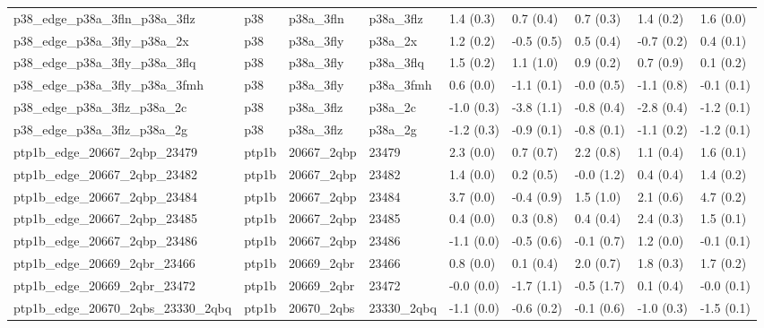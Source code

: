 \begin{tabular}{lllllllll}
p38\_edge\_p38a\_3fln\_p38a\_3flz     &       p38 &   p38a\_3fln &   p38a\_3flz &   1.4 (0.3) &         0.7 (0.4) &   0.7 (0.3) &   1.4 (0.2) &   1.6 (0.0) \\
p38\_edge\_p38a\_3fly\_p38a\_2x       &       p38 &   p38a\_3fly &     p38a\_2x &   1.2 (0.2) &        -0.5 (0.5) &   0.5 (0.4) &  -0.7 (0.2) &   0.4 (0.1) \\
p38\_edge\_p38a\_3fly\_p38a\_3flq     &       p38 &   p38a\_3fly &   p38a\_3flq &   1.5 (0.2) &         1.1 (1.0) &   0.9 (0.2) &   0.7 (0.9) &   0.1 (0.2) \\
p38\_edge\_p38a\_3fly\_p38a\_3fmh     &       p38 &   p38a\_3fly &   p38a\_3fmh &   0.6 (0.0) &        -1.1 (0.1) &  -0.0 (0.5) &  -1.1 (0.8) &  -0.1 (0.1) \\
p38\_edge\_p38a\_3flz\_p38a\_2c       &       p38 &   p38a\_3flz &     p38a\_2c &  -1.0 (0.3) &        -3.8 (1.1) &  -0.8 (0.4) &  -2.8 (0.4) &  -1.2 (0.1) \\
p38\_edge\_p38a\_3flz\_p38a\_2g       &       p38 &   p38a\_3flz &     p38a\_2g &  -1.2 (0.3) &        -0.9 (0.1) &  -0.8 (0.1) &  -1.1 (0.2) &  -1.2 (0.1) \\
ptp1b\_edge\_20667\_2qbp\_23479      &     ptp1b &  20667\_2qbp &       23479 &   2.3 (0.0) &         0.7 (0.7) &   2.2 (0.8) &   1.1 (0.4) &   1.6 (0.1) \\
ptp1b\_edge\_20667\_2qbp\_23482      &     ptp1b &  20667\_2qbp &       23482 &   1.4 (0.0) &         0.2 (0.5) &  -0.0 (1.2) &   0.4 (0.4) &   1.4 (0.2) \\
ptp1b\_edge\_20667\_2qbp\_23484      &     ptp1b &  20667\_2qbp &       23484 &   3.7 (0.0) &        -0.4 (0.9) &   1.5 (1.0) &   2.1 (0.6) &   4.7 (0.2) \\
ptp1b\_edge\_20667\_2qbp\_23485      &     ptp1b &  20667\_2qbp &       23485 &   0.4 (0.0) &         0.3 (0.8) &   0.4 (0.4) &   2.4 (0.3) &   1.5 (0.1) \\
ptp1b\_edge\_20667\_2qbp\_23486      &     ptp1b &  20667\_2qbp &       23486 &  -1.1 (0.0) &        -0.5 (0.6) &  -0.1 (0.7) &   1.2 (0.0) &  -0.1 (0.1) \\
ptp1b\_edge\_20669\_2qbr\_23466      &     ptp1b &  20669\_2qbr &       23466 &   0.8 (0.0) &         0.1 (0.4) &   2.0 (0.7) &   1.8 (0.3) &   1.7 (0.2) \\
ptp1b\_edge\_20669\_2qbr\_23472      &     ptp1b &  20669\_2qbr &       23472 &  -0.0 (0.0) &        -1.7 (1.1) &  -0.5 (1.7) &   0.1 (0.4) &  -0.0 (0.1) \\
ptp1b\_edge\_20670\_2qbs\_23330\_2qbq &     ptp1b &  20670\_2qbs &  23330\_2qbq &  -1.1 (0.0) &        -0.6 (0.2) &  -0.1 (0.6) &  -1.0 (0.3) &  -1.5 (0.1) \\

\end{tabular}
